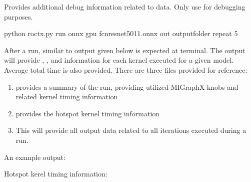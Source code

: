 \documentclass[letterpaper,10pt,english]{sphinxmanual}
\begin{document}
\begin{fulllineitems}
\label{\detokenize{dev/tools:cmdoption-debug}}
\end{fulllineitems}


\sphinxAtStartPar
Provides additional debug information related to data. Only use for debugging purposes.

\sphinxAtStartPar
{}

\sphinxAtStartPar
{}

\begin{sphinxVerbatim}[commandchars=\\\{\}]
python roctx.py \PYGZhy{}\PYGZhy{}run \PYGZsq{}\PYGZhy{}\PYGZhy{}onnx \PYGZhy{}\PYGZhy{}gpu fcn\PYGZhy{}resnet50\PYGZhy{}11.onnx\PYGZsq{} \PYGZhy{}\PYGZhy{}out output\PYGZus{}folder \PYGZhy{}\PYGZhy{}repeat 5
\end{sphinxVerbatim}

\sphinxAtStartPar
After a run, similar to output given below is expected at terminal. The output will provide , ,  and  information for each kernel executed for a given model.
Average total time is also provided. There are three files provided for reference:
\begin{enumerate}
%
\item {} 
\sphinxAtStartPar
{} provides a summary of the run, providing utilized MIGraphX knobs and related kernel timing information

\item {} 
\sphinxAtStartPar
{} provides the hotspot kernel timing information

\item {} 
\sphinxAtStartPar
This will provide all output data related to all iterations executed during a run.

\end{enumerate}

\sphinxAtStartPar
An example output:

\noindent{}

\sphinxAtStartPar
Hotspot kerel timing information:
\end{document}
